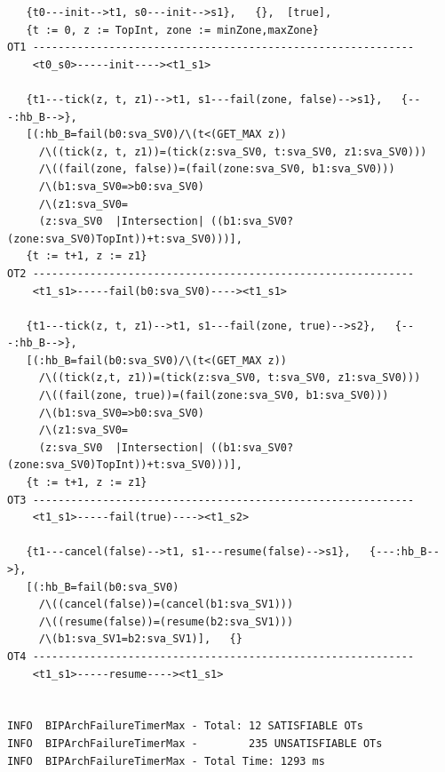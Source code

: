 \documentclass{llncs}
\makeatletter
\newcommand{\verbatimfont}[1]{\renewcommand{\verbatim@font}{\ttfamily#1}}
\makeatother
\begin{document}
\verbatimfont{\small}
\begin{verbatim}
   {t0---init-->t1, s0---init-->s1},   {},  [true],
   {t := 0, z := TopInt, zone := minZone,maxZone}
OT1 ------------------------------------------------------------
    <t0_s0>-----init----><t1_s1>

   {t1---tick(z, t, z1)-->t1, s1---fail(zone, false)-->s1},   {---:hb_B-->},
   [(:hb_B=fail(b0:sva_SV0)/\(t<(GET_MAX z))
     /\((tick(z, t, z1))=(tick(z:sva_SV0, t:sva_SV0, z1:sva_SV0)))
     /\((fail(zone, false))=(fail(zone:sva_SV0, b1:sva_SV0)))
     /\(b1:sva_SV0=>b0:sva_SV0)
     /\(z1:sva_SV0=
     (z:sva_SV0  |Intersection| ((b1:sva_SV0?(zone:sva_SV0)TopInt))+t:sva_SV0)))],
   {t := t+1, z := z1}
OT2 ------------------------------------------------------------
    <t1_s1>-----fail(b0:sva_SV0)----><t1_s1>

   {t1---tick(z, t, z1)-->t1, s1---fail(zone, true)-->s2},   {---:hb_B-->},
   [(:hb_B=fail(b0:sva_SV0)/\(t<(GET_MAX z))
     /\((tick(z,t, z1))=(tick(z:sva_SV0, t:sva_SV0, z1:sva_SV0)))
     /\((fail(zone, true))=(fail(zone:sva_SV0, b1:sva_SV0)))
     /\(b1:sva_SV0=>b0:sva_SV0)
     /\(z1:sva_SV0=
     (z:sva_SV0  |Intersection| ((b1:sva_SV0?(zone:sva_SV0)TopInt))+t:sva_SV0)))],
   {t := t+1, z := z1}
OT3 ------------------------------------------------------------
    <t1_s1>-----fail(true)----><t1_s2>

   {t1---cancel(false)-->t1, s1---resume(false)-->s1},   {---:hb_B-->},
   [(:hb_B=fail(b0:sva_SV0)
     /\((cancel(false))=(cancel(b1:sva_SV1)))
     /\((resume(false))=(resume(b2:sva_SV1)))
     /\(b1:sva_SV1=b2:sva_SV1)],   {}
OT4 ------------------------------------------------------------
    <t1_s1>-----resume----><t1_s1>


INFO  BIPArchFailureTimerMax - Total: 12 SATISFIABLE OTs
INFO  BIPArchFailureTimerMax -        235 UNSATISFIABLE OTs
INFO  BIPArchFailureTimerMax - Total Time: 1293 ms
\end{verbatim}


\end{document}
